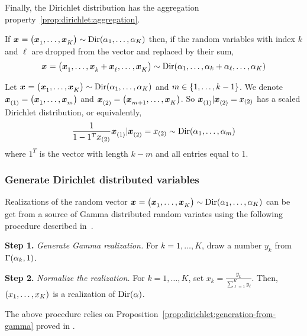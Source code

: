 Finally, the Dirichlet distribution has the aggregation property~\ref{prop:dirichlet:aggregation}.

\begin{prop}\label{prop:dirichlet:aggregation}
  If $\va x=\bracket{\va x_1,\ldots,\va x_K}\sim \Dir\bracket{\alpha_1,\ldots,\alpha_K}$ then, if the random variables with index $k$ and $\ell$ are dropped from the vector and replaced by their sum,
  $$\va x=\bracket{\va x_1,\ldots,\va x_k+\va x_{\ell},\ldots,\va x_K}\sim \Dir\bracket{\alpha_1,\ldots,\alpha_k+\alpha_{\ell},\ldots,\alpha_K}$$
\end{prop}



\begin{prop}\label{prop:dirichlet:conditional}
  Let $\va x=\bracket{\va x_1,\ldots,\va x_K}\sim \Dir\bracket{\alpha_1,\ldots,\alpha_K}$ and $m\in\range[1]{k-1}$.
  We denote $\va x_{(1)}=\bracket{\va x_1,\ldots,\va x_m}$ and $\va x_{(2)}=\bracket{\va x_{m+1},\ldots,\va x_K}$.
  So $\va x_{(1)}|\va x_{(2)}=x_{(2)}$ has a scaled Dirichlet distribution, or equivalently,
  $$
  \frac{1}{1-1^T x_{(2)}} \va x_{(1)}|\va x_{(2)}=x_{(2)}
  \sim
  \Dir\bracket{\alpha_1,\ldots,\alpha_m}
  $$
  where $1^T$ is the vector with length $k-m$ and all entries equal to 1.
\end{prop}




\subsubsection{Generate Dirichlet distributed variables}


Realizations of the random vector $\va x=\bracket{\va x_1,\ldots,\va x_K}\sim\Dir\bracket{\alpha_1,\ldots,\alpha_K}$ can be get from a source of Gamma distributed random variates using the following procedure described in~\cite{Frigyik2010}.

\textbf{Step 1.} \emph{Generate Gamma realization.} For $k=1,\ldots,K$, draw a number $y_k$ from $\Gamma\bracket{\alpha_k,1}$.

\textbf{Step 2.} \emph{Normalize the realization.} For $k=1,\ldots,K$, set $x_k=\frac{y_k}{\sum_{\ell=1}^K y_{\ell}}$. Then, $\bracket{x_1,\ldots,x_K}$ is a realization of $\Dir\bracket{\alpha}$.

The above procedure relies on Proposition~\ref{prop:dirichlet:generation-from-gamma} proved in \cite{Devroye1986}.

